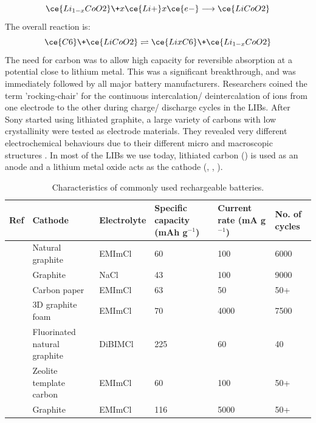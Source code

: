 \begin{equation}
\ce{Li_{1-x}CoO2} \+ x\ce{Li+} x\ce{e-} \longrightarrow \ce{LiCoO2}
\end{equation}
The overall reaction is:
\begin{equation}
\ce{C6} \+ \ce{LiCoO2} \rightleftharpoons \ce{LixC6} \+ \ce{Li_{1-x}CoO2}
\end{equation}
The need for carbon was to allow high capacity for reversible  absorption at a potential close to lithium metal. This was a significant breakthrough, and was immediately followed by all major battery manufacturers. Researchers coined the term 'rocking-chair' for the  continuous intercalation/ deintercalation of ions from one electrode to the other during charge/ discharge cycles in the LIBs. After Sony started using lithiated graphite, a large variety of carbons with low crystallinity were tested as electrode materials. They revealed very different electrochemical behaviours due to their different micro and macroscopic structures \cite{yoo_large_2008}. In most of the LIBs we use today, lithiated carbon () is used as an anode and a lithium metal oxide acts as the cathode (, , ).  

\begin{table}
\caption{Characteristics of commonly used rechargeable batteries.} \label{tabCref}
\begin{center}
\begin{tabular}{ |p{0.5cm}|p{2.5cm}|p{2cm}|p{2.5cm}|p{2.5cm}|p{1.5cm}|}
\hline
\textbf{Ref} & \textbf{Cathode} & \textbf{Electrolyte} & \textbf{Specific capacity (mAh g$^{-1}$)} & \textbf{Current rate (mA g$^{-1}$)} & \textbf{No. of cycles} \\
\hline
\cite{wang_advanced_2017} & Natural graphite & EMImCl & 60 & 100 & 6000 \\
\cite{song_long-life_2017} & Graphite & NaCl & 43 & 100 & 9000 \\
\cite{sun_new_2015} & Carbon paper & EMImCl & 63 & 50 & 50+ \\
\cite{lin_ultrafast_2015-3} & 3D graphite foam & EMImCl & 70 & 4000 & 7500 \\
\cite{rani_fluorinated_2013} & Fluorinated natural graphite & DiBIMCl & 225 & 60 & 40 \\
\cite{stadie_zeolite-templated_2017} & Zeolite template carbon & EMImCl & 60 & 100 & 50+ \\
& Graphite & EMImCl & 116 & 5000 & 50+ \\*

\hline
\end{tabular}
\end{center}
\end{table}

